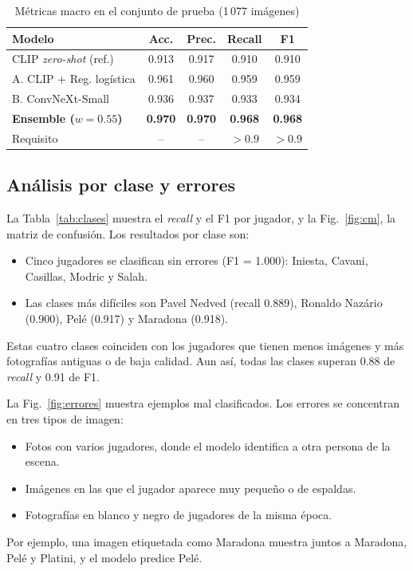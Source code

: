\documentclass[journal]{IEEEtran}
\begin{document}
\begin{table}[!t]
\centering
\caption{Métricas macro en el conjunto de prueba (1\,077 imágenes)}
\label{tab:res}
\footnotesize
\setlength{\tabcolsep}{4pt}
\begin{tabular}{lcccc}
\toprule
\textbf{Modelo} & \textbf{Acc.} & \textbf{Prec.} & \textbf{Recall} & \textbf{F1}\\
\midrule
CLIP \textit{zero-shot} (ref.) & 0.913 & 0.917 & 0.910 & 0.910\\
A. CLIP + Reg. logística & 0.961 & 0.960 & 0.959 & 0.959\\
B. ConvNeXt-Small & 0.936 & 0.937 & 0.933 & 0.934\\
\textbf{Ensemble ($w=0.55$)} & \textbf{0.970} & \textbf{0.970} & \textbf{0.968} & \textbf{0.968}\\
\midrule
Requisito & -- & -- & $>0.9$ & $>0.9$\\
\bottomrule
\end{tabular}
\end{table}

\subsection{Análisis por clase y errores}
La Tabla~\ref{tab:clases} muestra el \textit{recall} y el F1 por jugador, y la Fig.~\ref{fig:cm}, la matriz de confusión. Los resultados por clase son:
\begin{itemize}
\item Cinco jugadores se clasifican sin errores (F1 = 1.000): Iniesta, Cavani, Casillas, Modric y Salah.
\item Las clases más difíciles son Pavel Nedved (recall 0.889), Ronaldo Nazário (0.900), Pelé (0.917) y Maradona (0.918).
\end{itemize}
Estas cuatro clases coinciden con los jugadores que tienen menos imágenes y más fotografías antiguas o de baja calidad. Aun así, todas las clases superan 0.88 de \textit{recall} y 0.91 de F1.

La Fig.~\ref{fig:errores} muestra ejemplos mal clasificados. Los errores se concentran en tres tipos de imagen:
\begin{itemize}
\item Fotos con varios jugadores, donde el modelo identifica a otra persona de la escena.
\item Imágenes en las que el jugador aparece muy pequeño o de espaldas.
\item Fotografías en blanco y negro de jugadores de la misma época.
\end{itemize}
Por ejemplo, una imagen etiquetada como Maradona muestra juntos a Maradona, Pelé y Platini, y el modelo predice Pelé.
\end{document}
